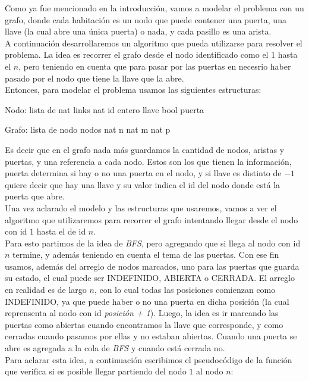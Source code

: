 Como ya fue mencionado en la introducción, vamos a modelar el problema con un grafo, donde cada habitación es un nodo que puede contener una puerta, una llave (la cual abre una única puerta) o nada, y cada pasillo es una arista. \\
A continuación desarrollaremos un algoritmo que pueda utilizarse para resolver el problema. La idea es recorrer el grafo desde el nodo identificado como el $1$ hasta el $n$, pero teniendo en cuenta que para pasar por las puertas en necesrio haber pasado por el nodo que tiene la llave que la abre. \\
Entonces, para modelar el problema usamos las siguientes estructuras:

\begin{verbatimtab}
Nodo:
	lista de nat links
	nat id
	entero llave
	bool puerta
\end{verbatimtab}

\begin{verbatimtab}
Grafo:
	lista de nodo nodos
	nat n
	nat m
	nat p
\end{verbatimtab}

Es decir que en el grafo nada más guardamos la cantidad de nodos, aristas y puertas, y una referencia a cada nodo. Estos son los que tienen la información, puerta determina si hay o no una puerta en el nodo, y si llave es distinto de $-1$ quiere decir que hay una llave y su valor indica el id del nodo donde está la puerta que abre. \\
Una vez aclarado el modelo y las estructuras que usaremos, vamos a ver el algoritmo que utilizaremos para recorrer el grafo intentando llegar desde el nodo con id $1$ hasta el de id $n$. \\
Para esto partimos de la idea de \textit{BFS}, pero agregando que si llega al nodo con id $n$ termine, y además teniendo en cuenta el tema de las puertas. Con ese fin usamos, además del arreglo de nodos marcados, uno para las puertas que guarda su estado, el cual puede ser INDEFINIDO, ABIERTA o CERRADA. El arreglo en realidad es de largo $n$, con lo cual todas las posiciones comienzan como INDEFINIDO, ya que puede haber o no una puerta en dicha posición (la cual reprensenta al nodo con id \textit{posición + 1}). Luego, la idea es ir marcando las puertas como abiertas cuando encontramos la llave que corresponde, y como cerradas cuando pasamos por ellas y no estaban abiertas. Cuando una puerta se abre es agregada a la cola de \textit{BFS} y cuando está cerrada no. \\
Para aclarar esta idea, a continuación escribimos el pseudocódigo de la función que verifica si es posible llegar partiendo del nodo $1$ al nodo $n$:


